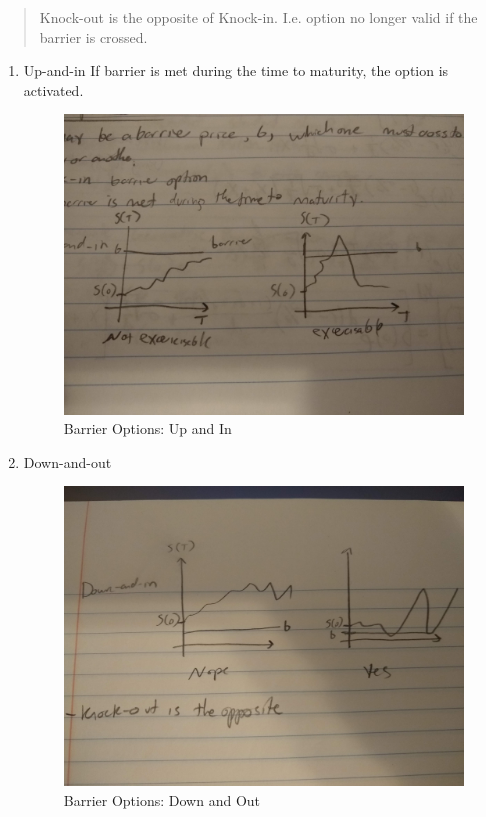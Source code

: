 \documentclass[11pt]{article}
\begin{document}
\begin{quote}
Knock-out is the opposite of Knock-in. I.e. option no longer valid if the
barrier is crossed.
\end{quote}
\begin{enumerate}
\item Up-and-in
\label{sec:orge9a2ded}
If barrier is met during the time to maturity, the option is activated.

\begin{figure}[htbp]
\centering
\includegraphics[width=.9\linewidth]{./resources/barrier_options.jpg}
\caption{\label{fig:orga6d9573}Barrier Options: Up and In}
\end{figure}

\item Down-and-out
\label{sec:org5b93fc2}

\begin{figure}[htbp]
\centering
\includegraphics[width=.9\linewidth]{./resources/barrier_downandout.jpg}
\caption{\label{fig:orgf01a383}Barrier Options: Down and Out}
\end{figure}
\end{enumerate}
\end{document}
